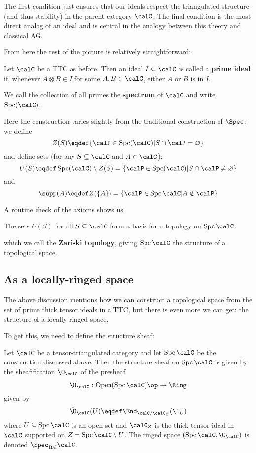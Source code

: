 \documentclass[12pt]{article}
\DeclareMathOperator{\Spc}{Spc}
\begin{document}
\begin{rmk}
	The first condition just ensures that our ideals respect the triangulated structure (and thus stability) in the parent category $\calC$. 
	The final condition is the most direct analog of an ideal and is central in the analogy between this theory and classical AG.
\end{rmk}
From here the rest of the picture is relatively straightforward:
\begin{defn}
	Let $\calC$ be a TTC as before. Then an ideal $I\subseteq\calC$ is called a \textbf{prime ideal}
	if, whenever $A\otimes B\in I$ for some $A,B\in \calC$, either $A$ or $B$ is in $I$.

	We call the collection of all primes the \textbf{spectrum} of $\calC$ and write 
	$\operatorname{Spc}(\calC)$.
\end{defn}

Here the construction varies slightly from the traditional construction of $\Spec$: we define 
\[Z(S)\eqdef\{\calP\in\Spc(\calC)|S\cap\calP=\varnothing\}\]
and define sets (for any $S\subseteq\calC$ and $A\in \calC$):
\[U(S)\eqdef \Spc(\calC)\setminus Z(S)=\{\calP\in\Spc(\calC)|S\cap \calP\ne\varnothing\}\]
and
\[\supp(A)\eqdef Z(\{A\})=\{\calP\in\Spc\calC|A\notin \calP\}\]

A routine check of the axioms shows us
\begin{lem}
	The sets $U(S)$ for all $S\subseteq\calC$ form a basis for a topology on $\Spc\calC$.
\end{lem}
which we call the \textbf{Zariski topology}, giving $\Spc\calC$ the structure of a topological space.

\subsection{As a locally-ringed space}
The above discussion mentions how we can construct a topological space from the set of prime thick tensor ideals 
in a TTC, but there is even more we can get: the structure of a locally-ringed space. 

To get this, we need to define the structure sheaf:
\begin{defn}
	Let $\calC$ be a tensor-triangulated category and let $\Spc\calC$ be the construction discussed above. Then the structure sheaf on $\Spc\calC$ is given by the 
	sheafification $\O_\calC$ of the presheaf 
	\[\tilde\O_\calC:\operatorname{Open}(\Spc\calC)\op\to \Ring\]
	given by 
	\[\tilde\O_\calC(U)\eqdef \End_{\calC/\calC_Z}(\1_U)\]
	where $U\subseteq\Spc\calC$ is an open set and $\calC_Z$ is the thick tensor ideal in $\calC$ supported 
	on $Z=\Spc\calC\setminus U$. The ringed space $(\Spc \calC,\O_\calC)$ is denoted $\Spec_\text{Bal} \calC$.
\end{defn}
\end{document}
